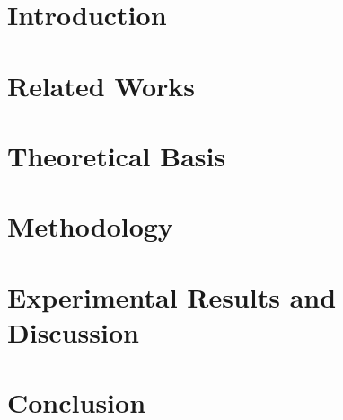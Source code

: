 \documentclass[qualificacao, mestrado, pre-defesa]{packages/icmc}
\begin{document}
\textual

\chapter{Introduction}
\label{chapter:introduction}


\chapter{Related Works}
\label{chapter:related_works}


\chapter{Theoretical Basis}
\label{chapter:theoretical_basis}


\chapter{Methodology}
\label{chapter:methodology}


\chapter{Experimental Results and Discussion}
\label{chapter:experimental_results}


\chapter{Conclusion}
\label{chapter:conclusion}



% 

% 

% 
\end{document}
